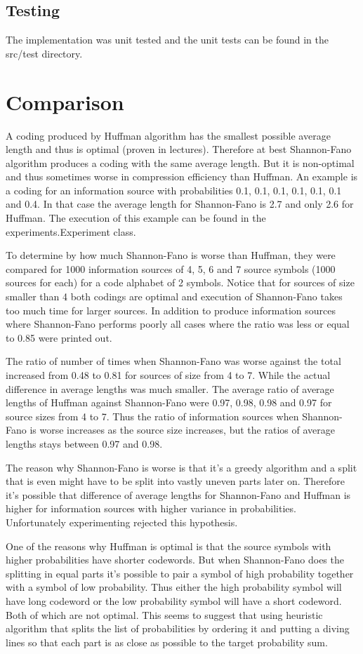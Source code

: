 \documentclass{article}
\begin{document}
\subsection{Testing}

The implementation was unit tested and the unit tests can be found in the src/test directory.

\section{Comparison}

A coding produced by Huffman algorithm has the smallest possible average length and thus is optimal (proven in lectures). Therefore at best Shannon-Fano algorithm produces a coding with the same average length. But it is non-optimal and thus sometimes worse in compression efficiency than Huffman. An example is a coding for an information source with probabilities 0.1, 0.1, 0.1, 0.1, 0.1, 0.1 and 0.4. In that case the average length for Shannon-Fano is 2.7 and only 2.6 for Huffman. The execution of this example can be found in the experiments.Experiment class.

To determine by how much Shannon-Fano is worse than Huffman, they were compared for 1000 information sources of 4, 5, 6 and 7 source symbols (1000 sources for each) for a code alphabet of 2 symbols. Notice that for sources of size smaller than 4 both codings are optimal and execution of Shannon-Fano takes too much time for larger sources. In addition to produce information sources where Shannon-Fano performs poorly all cases where the ratio was less or equal to 0.85 were printed out.

The ratio of number of times when Shannon-Fano was worse against the total increased from 0.48 to 0.81 for sources of size from 4 to 7. While the actual difference in average lengths was much smaller. The average ratio of average lengths of Huffman against Shannon-Fano were 0.97, 0.98, 0.98 and 0.97 for source sizes from 4 to 7. Thus the ratio of information sources when Shannon-Fano is worse increases as the source size increases, but the ratios of average lengths stays between 0.97 and 0.98.

The reason why Shannon-Fano is worse is that it's a greedy algorithm and a split that is even might have to be split into vastly uneven parts later on. Therefore it's possible that difference of average lengths for Shannon-Fano and Huffman is higher for information sources with higher variance in probabilities. Unfortunately experimenting rejected this hypothesis.

One of the reasons why Huffman is optimal is that the source symbols with higher probabilities have shorter codewords. But when Shannon-Fano does the splitting in equal parts it's possible to pair a symbol of high probability together with a symbol of low probability. Thus either the high probability symbol will have long codeword or the low probability symbol will have a short codeword. Both of which are not optimal.
This seems to suggest that using heuristic algorithm that splits the list of probabilities by ordering it and putting a diving lines so that each part is as close as possible to the target probability sum. 
\end{document}
